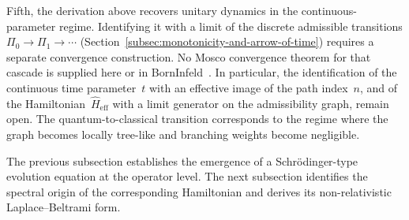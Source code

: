       Fifth, the derivation above recovers unitary dynamics in the continuous-parameter regime.
      Identifying it with a limit of the discrete admissible transitions
      $\Pi_0 \to \Pi_1 \to \cdots$
      (Section~\ref{subsec:monotonicity-and-arrow-of-time}) requires a separate convergence construction.
      No Mosco convergence theorem for that cascade is supplied here or in BornInfeld~\cite{Beau2026c}.
      In particular, the identification of the continuous time parameter~$t$ with an effective image
      of the path index~$n$, and of the Hamiltonian~$\hat{H}_{\mathrm{eff}}$ with a limit generator
      on the admissibility graph, remain open.
      The quantum-to-classical transition corresponds to the regime where the graph
      becomes locally tree-like and branching weights become negligible.

      The previous subsection establishes the emergence of a Schr\"odinger-type evolution
      equation at the operator level.
      The next subsection identifies the spectral origin of the corresponding Hamiltonian and
      derives its non-relativistic Laplace--Beltrami form.
